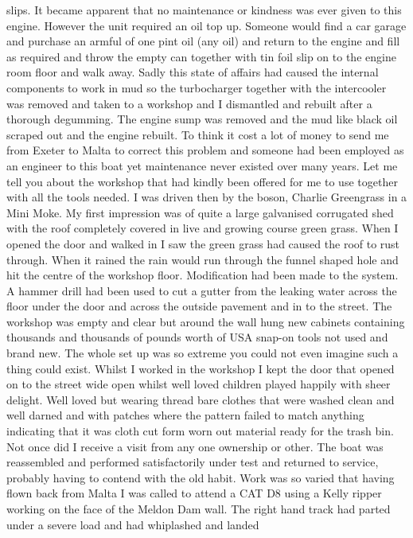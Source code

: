 slips. It became apparent that no maintenance or kindness was ever given to
this engine. However the unit required an oil top up. Someone would find a car
garage and purchase an armful of one pint oil (any oil) and return to the
engine and fill as required and throw the empty can together with tin foil slip
on to the engine room floor and walk away. Sadly this state of affairs had
caused the internal components to work in mud so the turbocharger together with
the intercooler was removed and taken to a workshop and I dismantled and
rebuilt after a thorough degumming. The engine sump was removed and the mud
like black oil scraped out and the engine rebuilt. To think it cost a lot of
money to send me from Exeter to Malta to correct this problem and someone had
been employed as an engineer to this boat yet maintenance never existed over
many years. Let me tell you about the workshop that had kindly been offered for
me to use together with all the tools needed. I was driven then by the boson,
Charlie Greengrass in a Mini Moke. My first impression was of quite a large
galvanised corrugated shed with the roof completely covered in live and growing
course green grass. When I opened the door and walked in I saw the green grass
had caused the roof to rust through. When it rained the rain would run through
the funnel shaped hole and hit the centre of the workshop floor. Modification
had been made to the system. A hammer drill had been used to cut a gutter from
the leaking water across the floor under the door and across the outside
pavement and in to the street. The workshop was empty and clear but around the
wall hung new cabinets containing thousands and thousands of pounds worth of
USA snap-on tools not used and brand new. The whole set up was so extreme you
could not even imagine such a thing could exist. Whilst I worked in the
workshop I kept the door that opened on to the street wide open whilst well
loved children played happily with sheer delight. Well loved but wearing thread
bare clothes that were washed clean and well darned and with patches where the
pattern failed to match anything indicating that it was cloth cut form worn out
material ready for the trash bin. Not once did I receive a visit from any one
ownership or other. The boat was reassembled and performed satisfactorily under
test and returned to service, probably having to contend with the old habit.
Work was so varied that having flown back from Malta I was called to attend a
CAT D8 using a Kelly ripper working on the face of the Meldon Dam wall. The
right hand track had parted under a severe load and had whiplashed and landed
